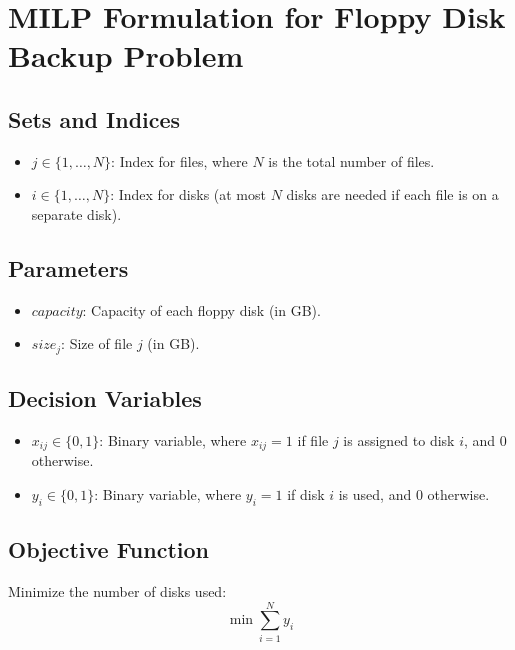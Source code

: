 \documentclass{article}
\begin{document}
\section*{MILP Formulation for Floppy Disk Backup Problem}

\subsection*{Sets and Indices}
\begin{itemize}
    \item $j \in \{1, \ldots, N\}$: Index for files, where $N$ is the total number of files.
    \item $i \in \{1, \ldots, N\}$: Index for disks (at most $N$ disks are needed if each file is on a separate disk).
\end{itemize}

\subsection*{Parameters}
\begin{itemize}
    \item $capacity$: Capacity of each floppy disk (in GB).
    \item $size_j$: Size of file $j$ (in GB).
\end{itemize}

\subsection*{Decision Variables}
\begin{itemize}
    \item $x_{ij} \in \{0, 1\}$: Binary variable, where $x_{ij} = 1$ if file $j$ is assigned to disk $i$, and 0 otherwise.
    \item $y_i \in \{0, 1\}$: Binary variable, where $y_i = 1$ if disk $i$ is used, and 0 otherwise.
\end{itemize}

\subsection*{Objective Function}
Minimize the number of disks used:
\[
\min \sum_{i=1}^{N} y_i
\]
\end{document}
